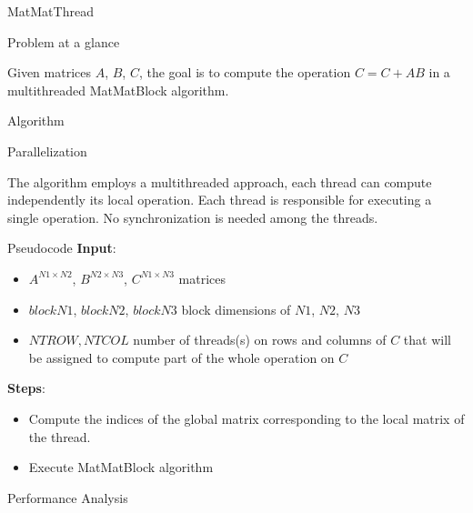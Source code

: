 \begin{chapter}{MatMatThread}
    \begin{section}{Problem at a glance}
        \par Given matrices $A$, $B$, $C$, the goal is to compute the  operation $C = C + AB$ in a multithreaded MatMatBlock algorithm.
    \end{section}
    \begin{section}{Algorithm}
        \begin{subsection}{Parallelization}
            \par The algorithm employs a multithreaded approach, each thread can compute independently its local  operation. Each thread is responsible for executing a single  operation. No synchronization is needed among the threads.
        \end{subsection}
        \begin{subsection}{Pseudocode}
            \textbf{Input}:
            \begin{itemize}
                \item $A^{N1 \times N2}$, $B^{N2 \times N3}$, $C^{N1 \times N3}$ matrices
                \item $blockN1$, $blockN2$, $blockN3$ block dimensions of $N1$, $N2$, $N3$
                \item $NTROW, NTCOL$ number of threads(s) on rows and columns of $C$ that will be assigned to compute part of the whole  operation on $C$
            \end{itemize}
            \textbf{Steps}:
            \begin{itemize}
                \item Compute the indices of the global matrix corresponding to the local matrix of the thread.
                \item Execute MatMatBlock algorithm
            \end{itemize}
            
        \end{subsection}
        \clearpage
        \begin{subsection}{Performance Analysis}
            \begin{figure}[ht]
                \centering
                
                \label{fig:matmatthread-exectime}
            \end{figure}
            \begin{figure}[ht]
                \centering
                
                \label{fig:matmatthread-speedup}
            \end{figure}
            \begin{figure}[ht]
                \centering
                
                \label{fig:matmatthread-efficiency}
            \end{figure}
        \end{subsection}
    \end{section}
\end{chapter}